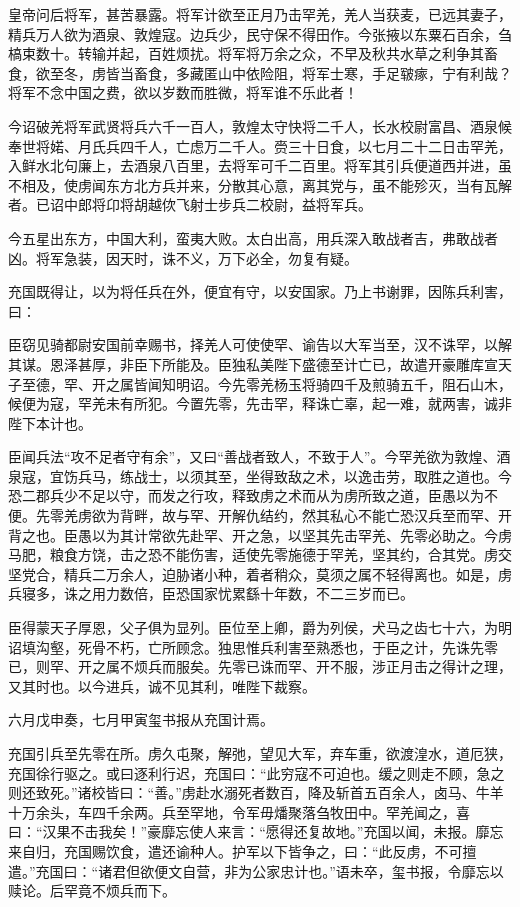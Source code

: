 \documentclass[]{article}
\begin{document}
皇帝问后将军，甚苦暴露。将军计欲至正月乃击罕羌，羌人当获麦，已远其妻子，精兵万人欲为酒泉、敦煌寇。边兵少，民守保不得田作。今张掖以东粟石百余，刍槁束数十。转输并起，百姓烦扰。将军将万余之众，不早及秋共水草之利争其畜食，欲至冬，虏皆当畜食，多藏匿山中依险阻，将军士寒，手足皲瘃，宁有利哉？将军不念中国之费，欲以岁数而胜微，将军谁不乐此者！

今诏破羌将军武贤将兵六千一百人，敦煌太守快将二千人，长水校尉富昌、酒泉候奉世将婼、月氏兵四千人，亡虑万二千人。赍三十日食，以七月二十二日击罕羌，入鲜水北句廉上，去酒泉八百里，去将军可千二百里。将军其引兵便道西并进，虽不相及，使虏闻东方北方兵并来，分散其心意，离其党与，虽不能殄灭，当有瓦解者。已诏中郎将卬将胡越佽飞射士步兵二校尉，益将军兵。

今五星出东方，中国大利，蛮夷大败。太白出高，用兵深入敢战者吉，弗敢战者凶。将军急装，因天时，诛不义，万下必全，勿复有疑。

充国既得让，以为将任兵在外，便宜有守，以安国家。乃上书谢罪，因陈兵利害，曰：

臣窃见骑都尉安国前幸赐书，择羌人可使使罕、谕告以大军当至，汉不诛罕，以解其谋。恩泽甚厚，非臣下所能及。臣独私美陛下盛德至计亡已，故遣开豪雕库宣天子至德，罕、开之属皆闻知明诏。今先零羌杨玉将骑四千及煎骑五千，阻石山木，候便为寇，罕羌未有所犯。今置先零，先击罕，释诛亡辜，起一难，就两害，诚非陛下本计也。

臣闻兵法``攻不足者守有余''，又曰``善战者致人，不致于人''。今罕羌欲为敦煌、酒泉寇，宜饬兵马，练战士，以须其至，坐得致敌之术，以逸击劳，取胜之道也。今恐二郡兵少不足以守，而发之行攻，释致虏之术而从为虏所致之道，臣愚以为不便。先零羌虏欲为背畔，故与罕、开解仇结约，然其私心不能亡恐汉兵至而罕、开背之也。臣愚以为其计常欲先赴罕、开之急，以坚其先击罕羌、先零必助之。今虏马肥，粮食方饶，击之恐不能伤害，适使先零施德于罕羌，坚其约，合其党。虏交坚党合，精兵二万余人，迫胁诸小种，着者稍众，莫须之属不轻得离也。如是，虏兵寝多，诛之用力数倍，臣恐国家忧累繇十年数，不二三岁而已。

臣得蒙天子厚恩，父子俱为显列。臣位至上卿，爵为列侯，犬马之齿七十六，为明诏填沟壑，死骨不朽，亡所顾念。独思惟兵利害至熟悉也，于臣之计，先诛先零已，则罕、开之属不烦兵而服矣。先零已诛而罕、开不服，涉正月击之得计之理，又其时也。以今进兵，诚不见其利，唯陛下裁察。

六月戊申奏，七月甲寅玺书报从充国计焉。

充国引兵至先零在所。虏久屯聚，解弛，望见大军，弃车重，欲渡湟水，道厄狭，充国徐行驱之。或曰逐利行迟，充国曰：``此穷寇不可迫也。缓之则走不顾，急之则还致死。''诸校皆曰：``善。''虏赴水溺死者数百，降及斩首五百余人，卤马、牛羊十万余头，车四千余两。兵至罕地，令军毋燔聚落刍牧田中。罕羌闻之，喜曰：``汉果不击我矣！''豪靡忘使人来言：``愿得还复故地。''充国以闻，未报。靡忘来自归，充国赐饮食，遣还谕种人。护军以下皆争之，曰：``此反虏，不可擅遣。''充国曰：``诸君但欲便文自营，非为公家忠计也。''语未卒，玺书报，令靡忘以赎论。后罕竟不烦兵而下。
\end{document}
